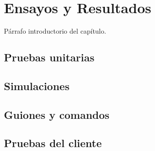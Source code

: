 \chapter{Ensayos y Resultados}
\label{Chapter4}

Párrafo introductorio del capítulo.

\section{Pruebas unitarias}

\section{Simulaciones}

\section{Guiones y comandos}

\section{Pruebas del cliente}